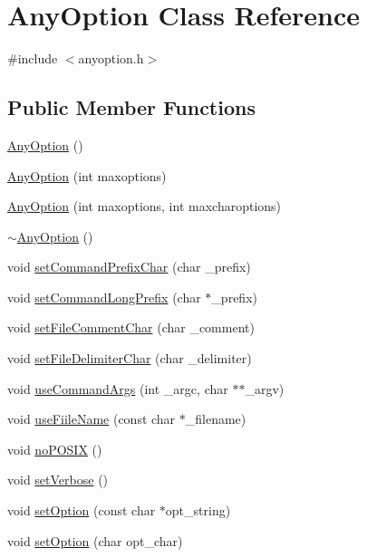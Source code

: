 \hypertarget{classAnyOption}{
\section{AnyOption Class Reference}
\label{classAnyOption}
}


{\ttfamily \#include $<$anyoption.h$>$}\subsection*{Public Member Functions}
\begin{DoxyCompactItemize}
\item 
\hyperlink{classAnyOption_a7ad756bb8efd62d1a808b0ee7add6990}{AnyOption} ()
\item 
\hyperlink{classAnyOption_a3feb7eaa2c8222054ca745a5aa6916a2}{AnyOption} (int maxoptions)
\item 
\hyperlink{classAnyOption_a8a88d8d2f9345018acb3b6f5993cbddd}{AnyOption} (int maxoptions, int maxcharoptions)
\item 
\hyperlink{classAnyOption_a98c6f71109a04081087f967d31f77965}{$\sim$AnyOption} ()
\item 
void \hyperlink{classAnyOption_abc3444f2cbbb06f7d6c9a63e49f4992a}{setCommandPrefixChar} (char \_\-prefix)
\item 
void \hyperlink{classAnyOption_ac0cd7c2ee11e27fc1a8f8097d8bb21fa}{setCommandLongPrefix} (char $\ast$\_\-prefix)
\item 
void \hyperlink{classAnyOption_a3b164315d146fbc1f8751b0542a8b495}{setFileCommentChar} (char \_\-comment)
\item 
void \hyperlink{classAnyOption_a1076bb812db730236c5309cdb97c8161}{setFileDelimiterChar} (char \_\-delimiter)
\item 
void \hyperlink{classAnyOption_a632154043f99bf2186f23b4eaaa297c8}{useCommandArgs} (int \_\-argc, char $\ast$$\ast$\_\-argv)
\item 
void \hyperlink{classAnyOption_a5b50b3fe6804f0ddce1a94a36d5cc29f}{useFiileName} (const char $\ast$\_\-filename)
\item 
void \hyperlink{classAnyOption_aeca5328f5046690e0d381c745c1872d5}{noPOSIX} ()
\item 
void \hyperlink{classAnyOption_a0db06dc9828c5242889610afcc740141}{setVerbose} ()
\item 
void \hyperlink{classAnyOption_a72320922fa1b9f02d7e744f517dcf479}{setOption} (const char $\ast$opt\_\-string)
\item 
void \hyperlink{classAnyOption_a45d3a142b3b222239640cb15febba737}{setOption} (char opt\_\-char)
$$
\end{DoxyCompactItemize}
